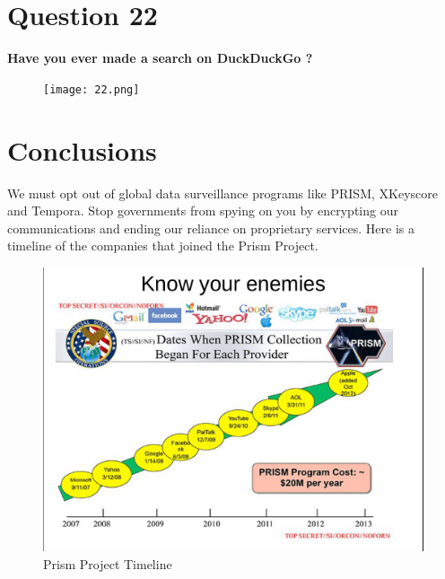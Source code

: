 \documentclass[11pt]{book}
\begin{document}
\newpage
\chapter{Question 22}
\textbf{Have you ever made a search on DuckDuckGo ?
}
\begin{figure}[ht!]
	\centering
	\texttt{[image: 22.png]}
	\label{overflow}
\end{figure}

\newpage
\chapter{Conclusions}
We must opt out of global data surveillance programs like PRISM, XKeyscore and Tempora. Stop governments from spying on you by encrypting our communications and ending our reliance on proprietary services.
Here is a timeline of the companies that joined the Prism Project.
\begin{figure}[ht!]
	\centering
	\includegraphics[width=150mm]{prism1.png}
	\caption{Prism Project Timeline}
	\label{overflow}
\end{figure}
\newpage
\end{document}
